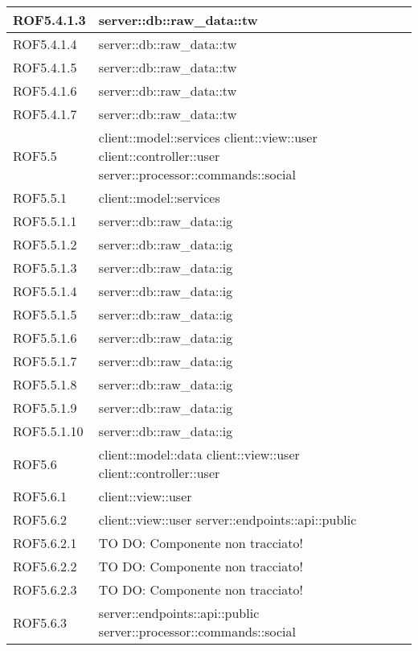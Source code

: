 \begin{center}
\begin{longtable}{| p{4cm} | p{8cm} |}
\hline
ROF5.4.1.3 & server::db::raw\_data::tw \\
\hline
ROF5.4.1.4 & server::db::raw\_data::tw \\
\hline
ROF5.4.1.5 & server::db::raw\_data::tw \\
\hline
ROF5.4.1.6 & server::db::raw\_data::tw \\
\hline
ROF5.4.1.7 & server::db::raw\_data::tw \\
\hline
ROF5.5 & client::model::services \newline client::view::user \newline client::controller::user \newline server::processor::commands::social \\
\hline
ROF5.5.1 & client::model::services \\
\hline
ROF5.5.1.1 & server::db::raw\_data::ig \\
\hline
ROF5.5.1.2 & server::db::raw\_data::ig \\
\hline
ROF5.5.1.3 & server::db::raw\_data::ig \\
\hline
ROF5.5.1.4 & server::db::raw\_data::ig \\
\hline
ROF5.5.1.5 & server::db::raw\_data::ig \\
\hline
ROF5.5.1.6 & server::db::raw\_data::ig \\
\hline
ROF5.5.1.7 & server::db::raw\_data::ig \\
\hline
ROF5.5.1.8 & server::db::raw\_data::ig \\
\hline
ROF5.5.1.9 & server::db::raw\_data::ig \\
\hline
ROF5.5.1.10 & server::db::raw\_data::ig \\
\hline
ROF5.6 & client::model::data \newline client::view::user \newline client::controller::user \\
\hline
ROF5.6.1 & client::view::user \\
\hline
ROF5.6.2 & client::view::user \newline server::endpoints::api::public \\
\hline
ROF5.6.2.1 & TO DO: Componente non tracciato! \\
\hline
ROF5.6.2.2 & TO DO: Componente non tracciato! \\
\hline
ROF5.6.2.3 & TO DO: Componente non tracciato! \\
\hline
ROF5.6.3 & server::endpoints::api::public \newline server::processor::commands::social \\

\end{longtable}
\end{center}
